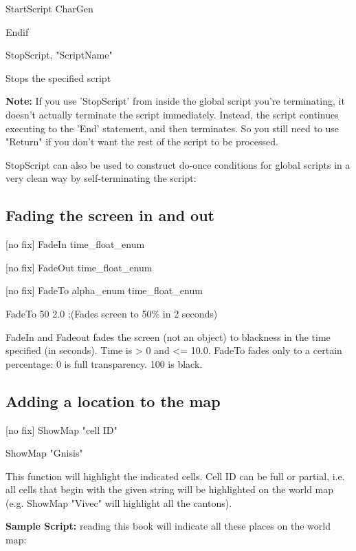 StartScript CharGen

Endif

StopScript, "ScriptName"

Stops the specified script

\textbf{Note:} If you use 'StopScript' from inside the global script
you're terminating, it doesn't actually terminate the script
immediately. Instead, the script continues executing to the 'End'
statement, and then terminates. So you still need to use "Return" if you
don't want the rest of the script to be processed.

StopScript can also be used to construct do-once conditions for global
scripts in a very clean way by self-terminating the script:



\hypertarget{fading-the-screen-in-and-out}{%
\subsection{Fading the screen in and
out}\label{fading-the-screen-in-and-out}}

{[}no fix{]} FadeIn time\_float\_enum

{[}no fix{]} FadeOut time\_float\_enum

{[}no fix{]} FadeTo alpha\_enum time\_float\_enum

FadeTo 50 2.0 ;(Fades screen to 50\% in 2 seconds)

FadeIn and Fadeout fades the screen (not an object) to blackness in the
time specified (in seconds). Time is \textgreater{} 0 and \textless=
10.0. FadeTo fades only to a certain percentage: 0 is full transparency.
100 is black.

\hypertarget{adding-a-location-to-the-map}{%
\subsection{Adding a location to the
map}\label{adding-a-location-to-the-map}}

{[}no fix{]} ShowMap "cell ID"

ShowMap "Gnisis"

This function will highlight the indicated cells. Cell ID can be full or
partial, i.e. all cells that begin with the given string will be
highlighted on the world map (e.g. ShowMap "Vivec" will highlight all
the cantons).

\textbf{Sample Script:} reading this book will indicate all these places
on the world map:

